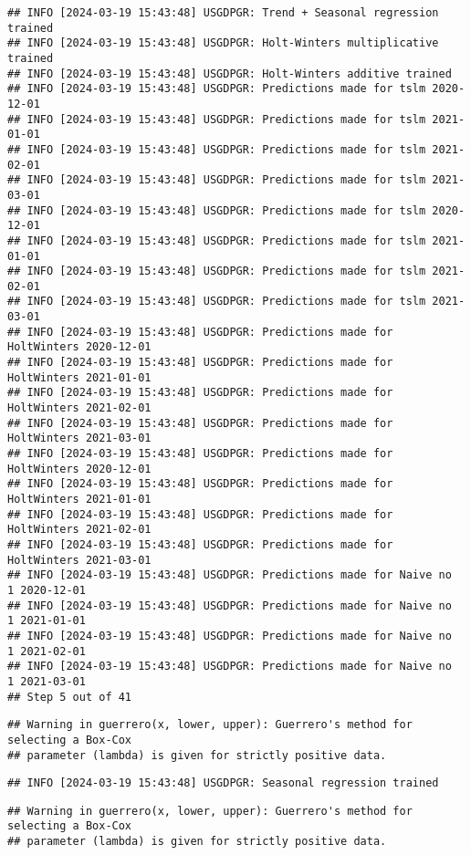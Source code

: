 \documentclass[
]{article}
\begin{document}
\begin{verbatim}
## INFO [2024-03-19 15:43:48] USGDPGR: Trend + Seasonal regression trained
## INFO [2024-03-19 15:43:48] USGDPGR: Holt-Winters multiplicative trained
## INFO [2024-03-19 15:43:48] USGDPGR: Holt-Winters additive trained
## INFO [2024-03-19 15:43:48] USGDPGR: Predictions made for tslm 2020-12-01
## INFO [2024-03-19 15:43:48] USGDPGR: Predictions made for tslm 2021-01-01
## INFO [2024-03-19 15:43:48] USGDPGR: Predictions made for tslm 2021-02-01
## INFO [2024-03-19 15:43:48] USGDPGR: Predictions made for tslm 2021-03-01
## INFO [2024-03-19 15:43:48] USGDPGR: Predictions made for tslm 2020-12-01
## INFO [2024-03-19 15:43:48] USGDPGR: Predictions made for tslm 2021-01-01
## INFO [2024-03-19 15:43:48] USGDPGR: Predictions made for tslm 2021-02-01
## INFO [2024-03-19 15:43:48] USGDPGR: Predictions made for tslm 2021-03-01
## INFO [2024-03-19 15:43:48] USGDPGR: Predictions made for HoltWinters 2020-12-01
## INFO [2024-03-19 15:43:48] USGDPGR: Predictions made for HoltWinters 2021-01-01
## INFO [2024-03-19 15:43:48] USGDPGR: Predictions made for HoltWinters 2021-02-01
## INFO [2024-03-19 15:43:48] USGDPGR: Predictions made for HoltWinters 2021-03-01
## INFO [2024-03-19 15:43:48] USGDPGR: Predictions made for HoltWinters 2020-12-01
## INFO [2024-03-19 15:43:48] USGDPGR: Predictions made for HoltWinters 2021-01-01
## INFO [2024-03-19 15:43:48] USGDPGR: Predictions made for HoltWinters 2021-02-01
## INFO [2024-03-19 15:43:48] USGDPGR: Predictions made for HoltWinters 2021-03-01
## INFO [2024-03-19 15:43:48] USGDPGR: Predictions made for Naive no  1 2020-12-01
## INFO [2024-03-19 15:43:48] USGDPGR: Predictions made for Naive no  1 2021-01-01
## INFO [2024-03-19 15:43:48] USGDPGR: Predictions made for Naive no  1 2021-02-01
## INFO [2024-03-19 15:43:48] USGDPGR: Predictions made for Naive no  1 2021-03-01
## Step 5 out of 41
\end{verbatim}

\begin{verbatim}
## Warning in guerrero(x, lower, upper): Guerrero's method for selecting a Box-Cox
## parameter (lambda) is given for strictly positive data.
\end{verbatim}

\begin{verbatim}
## INFO [2024-03-19 15:43:48] USGDPGR: Seasonal regression trained
\end{verbatim}

\begin{verbatim}
## Warning in guerrero(x, lower, upper): Guerrero's method for selecting a Box-Cox
## parameter (lambda) is given for strictly positive data.
\end{verbatim}
\end{document}
